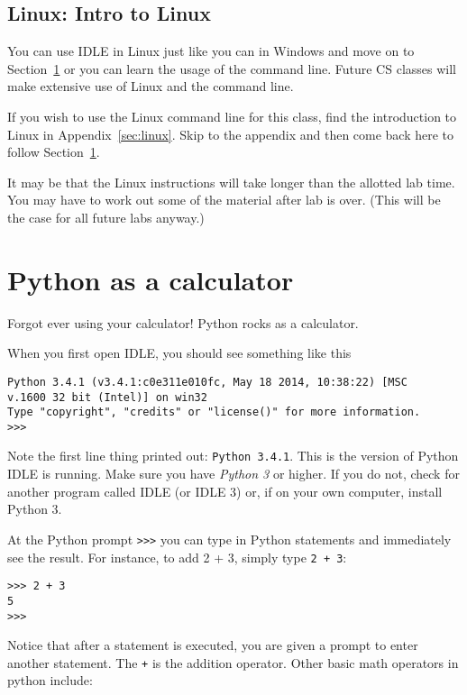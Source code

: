 \documentclass[12pt,hidelinks]{article}
\begin{document}
\subsection{Linux: Intro to Linux}

You can use IDLE in Linux just like you can in Windows and move on to
Section~\ref{sec:python-calc} or you can learn the usage of the command line.
Future CS classes will make extensive use of Linux and the command line.

If you wish to use the Linux command line for this class, find the introduction
to Linux in Appendix~\ref{sec:linux}. Skip to the appendix and then come back
here to follow Section~\ref{sec:python-calc}.

It may be that the Linux instructions will take longer than the allotted lab
time. You may have to work out some of the material after lab is over. (This
will be the case for all future labs anyway.)

\pagebreak
\section{Python as a calculator}
\label{sec:python-calc}
Forgot ever using your calculator! Python rocks as a calculator.

When you first open IDLE, you should see something like this
\begin{lstlisting}[style=bash]
Python 3.4.1 (v3.4.1:c0e311e010fc, May 18 2014, 10:38:22) [MSC
v.1600 32 bit (Intel)] on win32
Type "copyright", "credits" or "license()" for more information.
>>> 
\end{lstlisting}

Note the first line thing printed out: \texttt{Python 3.4.1}. This is the
version of Python IDLE is running. Make sure you have \emph{Python 3} or higher.
If you do not, check for another program called IDLE (or IDLE 3) or, if on your
own computer, install Python 3.

At the Python prompt \texttt{>>>} you can type in Python statements and
immediately see the result. For instance, to add 2 + 3, simply type \texttt{2 +
3}: 
\begin{lstlisting}[style=bash]
>>> 2 + 3
5
>>>
\end{lstlisting}

Notice that after a statement is executed, you are given a prompt to enter
another statement. The \texttt{+} is the addition operator. Other basic math
operators in python include:
\end{document}

